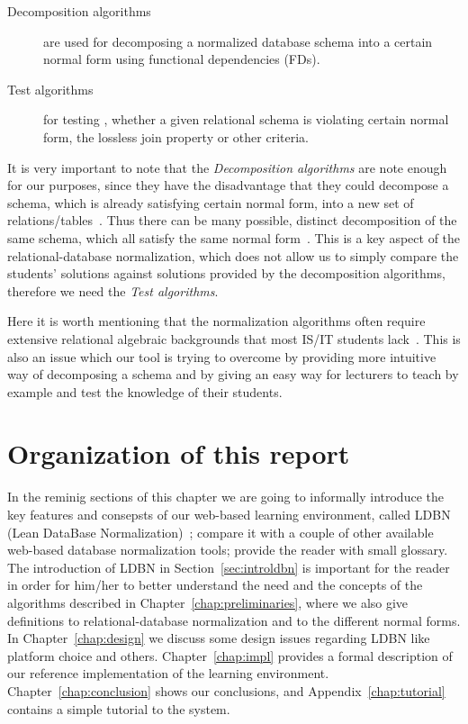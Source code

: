 \begin{description}
	\item[Decomposition algorithms] are used for decomposing a normalized database 
	schema into a certain normal form using functional dependencies (FDs).
	\item[Test algorithms] for testing , whether a given relational schema is 
	violating certain normal form, the lossless join property or other criteria.
\end{description}

It is very important to note that the \textit{Decomposition algorithms} are note enough for
our purposes, since they have the 
disadvantage that they could decompose a schema, which is already satisfying 
certain normal form, into a new set of relations/tables~\cite{p4}. Thus there can be many 
possible, distinct decomposition of the same schema, which all satisfy the same 
normal form~\cite{bdb4}. This is a key aspect of the relational-database normalization,
which does not allow us to simply compare the
students' solutions against solutions provided by the decomposition algorithms,
therefore we need the \textit{Test algorithms}.

Here it is worth mentioning that the normalization algorithms often require 
extensive relational algebraic backgrounds that most IS/IT students lack~\cite{p8}. This
is also an issue which our tool is trying to overcome by providing more intuitive 
way of decomposing a schema and by giving an easy way for lecturers to
teach by example and test the knowledge of their students. 

\section{Organization of this report}
\label{sec:organization}
In the reminig sections of this chapter we are going to informally introduce 
the key features and consepsts of our web-based learning environment, 
called LDBN (Lean DataBase Normalization)~\cite{wldbn}; 
compare it with a couple of other 
available web-based database normalization tools; provide the reader with small glossary.  
The introduction of LDBN in Section~\ref{sec:introldbn} is important for the reader
in order for him/her to better understand the need and the concepts of the algorithms described in 
Chapter~\ref{chap:preliminaries}, where we also give definitions to
relational-database normalization and to the different normal forms. 
In Chapter~\ref{chap:design} we discuss some design issues regarding LDBN like 
platform choice and others. Chapter~\ref{chap:impl} provides a formal description
of our reference implementation of the learning environment. 
Chapter~\ref{chap:conclusion} shows our conclusions, and 
Appendix~\ref{chap:tutorial} contains a simple tutorial to the system.

